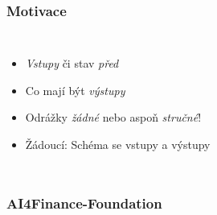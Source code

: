 




\begin{frame}
    \frametitle{Motivace}
    \begin{columns}
        \begin{itemize}
            \item \emph{Vstupy} či stav \emph{před}
            \item Co mají být \emph{výstupy}
            \item Odrážky \emph{žádné} nebo aspoň \emph{stručné}!
            \item Žádoucí: Schéma se vstupy a výstupy
        \end{itemize}

    \end{columns}
\end{frame}

\begin{frame}
    \frametitle{AI4Finance-Foundation}
\end{frame}

